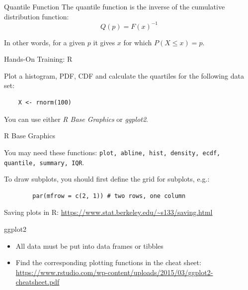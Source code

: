 \begin{frame}{Quantile Function}
    The quantile function is the inverse of the cumulative distribution function:
    \begin{equation*}
    Q(p) = F(x)^{-1}
    \end{equation*}
    
    In other words, for a given $p$ it gives $x$ for which $P(X \leq x) = p$.
\end{frame}

\begin{frame}[fragile]{Hands-On Training: R}

    Plot a histogram, PDF, CDF and calculate the quartiles for the following data set:
    {\small
    \begin{verbatim}
    X <- rnorm(100)
    \end{verbatim}}

    You can use either \emph{R Base Graphics} or \emph{ggplot2}.
    
\end{frame}

\begin{frame}[fragile]{R Base Graphics}

    You may need these functions: {\small\texttt{plot, abline, hist, density, ecdf, quantile, summary, IQR}}.
    
    To draw subplots, you should first define the grid for subplots, e.g.:
    {\small
        \begin{verbatim}
        par(mfrow = c(2, 1)) # two rows, one column
        \end{verbatim}}
    \vspace{-15pt}
    Saving plots in R:
    {\small \url{https://www.stat.berkeley.edu/~s133/saving.html}}

\end{frame}

\begin{frame}{ggplot2}

    \begin{itemize}
        \item All data must be put into data frames or tibbles
        \item Find the corresponding plotting functions in the cheat sheet:\\ {\small\url{https://www.rstudio.com/wp-content/uploads/2015/03/ggplot2-cheatsheet.pdf}}
    \end{itemize}

\end{frame}

